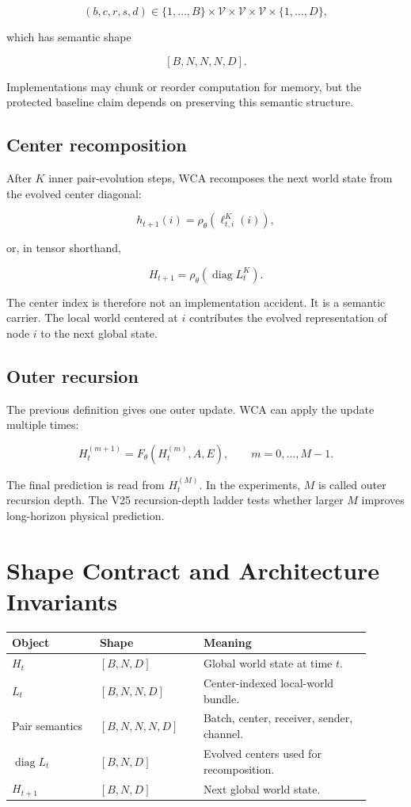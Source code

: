 \documentclass[11pt]{article}
\newcommand{\V}{\mathcal{V}}
\newcommand{\diag}{\operatorname{diag}}
\begin{document}
\[
(b,c,r,s,d) \in
\{1,\ldots,B\}\times \V \times \V \times \V \times \{1,\ldots,D\},
\]

which has semantic shape

\[
[B,N,N,N,D].
\]

Implementations may chunk or reorder computation for memory, but the protected
baseline claim depends on preserving this semantic structure.

\subsection{Center recomposition}

After $K$ inner pair-evolution steps, WCA recomposes the next world state from
the evolved center diagonal:

\[
h_{t+1}(i)
=
\rho_\theta\left(\ell^{K}_{t,i}(i)\right),
\]

or, in tensor shorthand,

\[
H_{t+1}
=
\rho_\theta\left(\diag L_t^K\right).
\]

The center index is therefore not an implementation accident. It is a semantic
carrier. The local world centered at $i$ contributes the evolved representation
of node $i$ to the next global state.

\subsection{Outer recursion}

The previous definition gives one outer update. WCA can apply the update
multiple times:

\[
H_{t}^{(m+1)}
=
F_\theta\left(H_t^{(m)}, A, E\right),
\qquad
m=0,\ldots,M-1.
\]

The final prediction is read from $H_t^{(M)}$. In the experiments, $M$ is
called outer recursion depth. The V25 recursion-depth ladder tests whether
larger $M$ improves long-horizon physical prediction.

\section{Shape Contract and Architecture Invariants}

\begin{longtable}{p{0.22\linewidth}p{0.26\linewidth}p{0.42\linewidth}}
\toprule
Object & Shape & Meaning \\
\midrule
$H_t$ & $[B,N,D]$ & Global world state at time $t$. \\
$L_t$ & $[B,N,N,D]$ & Center-indexed local-world bundle. \\
Pair semantics & $[B,N,N,N,D]$ & Batch, center, receiver, sender, channel. \\
$\diag L_t$ & $[B,N,D]$ & Evolved centers used for recomposition. \\
$H_{t+1}$ & $[B,N,D]$ & Next global world state. \\
\bottomrule
\end{longtable}
\end{document}
